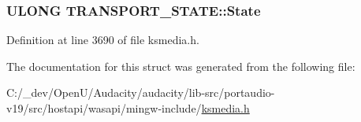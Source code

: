 \subsubsection[{\texorpdfstring{State}{State}}]{\setlength{\rightskip}{0pt plus 5cm}U\+L\+O\+NG T\+R\+A\+N\+S\+P\+O\+R\+T\+\_\+\+S\+T\+A\+T\+E\+::\+State}\hypertarget{struct_t_r_a_n_s_p_o_r_t___s_t_a_t_e_a0b2ae5ba62a876dc3ba3457d2e3ac273}{}\label{struct_t_r_a_n_s_p_o_r_t___s_t_a_t_e_a0b2ae5ba62a876dc3ba3457d2e3ac273}


Definition at line 3690 of file ksmedia.\+h.



The documentation for this struct was generated from the following file\+:\begin{DoxyCompactItemize}
\item 
C\+:/\+\_\+dev/\+Open\+U/\+Audacity/audacity/lib-\/src/portaudio-\/v19/src/hostapi/wasapi/mingw-\/include/\hyperlink{ksmedia_8h}{ksmedia.\+h}\end{DoxyCompactItemize}

